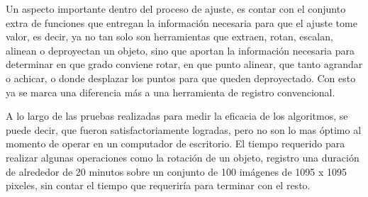 Un aspecto importante dentro del proceso de ajuste, es contar con el
conjunto extra de funciones que entregan la información necesaria para
que el ajuste tome valor, es decir, ya no tan solo son herramientas
que extraen, rotan, escalan, alinean o deproyectan un objeto, sino que
aportan la información necesaria para determinar en que grado conviene
rotar, en que punto alinear, que tanto agrandar o achicar, o donde
desplazar los puntos para que queden deproyectado. Con esto ya se
marca una diferencia más a una herramienta de registro convencional.

A lo largo de las pruebas realizadas para medir la eficacia de los
algoritmos, se puede decir, que fueron satisfactoriamente logradas,
pero no son lo mas óptimo al momento de operar en un computador de
escritorio. El tiempo requerido para realizar algunas operaciones como
la rotación de un objeto, registro una duración de alrededor de 20
minutos sobre un conjunto de 100 imágenes de 1095 x 1095 pixeles, sin
contar el tiempo que requeriría para terminar con el resto.

%
